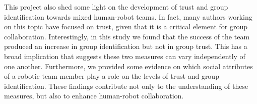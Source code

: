 This project also shed some light on the development of trust and group identification towards mixed human-robot teams. In fact, many authors working on this topic have focused on trust, given that it is a critical element for group collaboration. Interestingly, in this study we found that the success of the team produced an increase in group identification but not in group trust. This has a broad implication that suggests these two measures can vary independently of one another. Furthermore, we provided some evidence on which social attributes of a robotic team member play a role on the levels of trust and group identification. These findings contribute not only to the understanding of these measures, but also to enhance human-robot collaboration.

